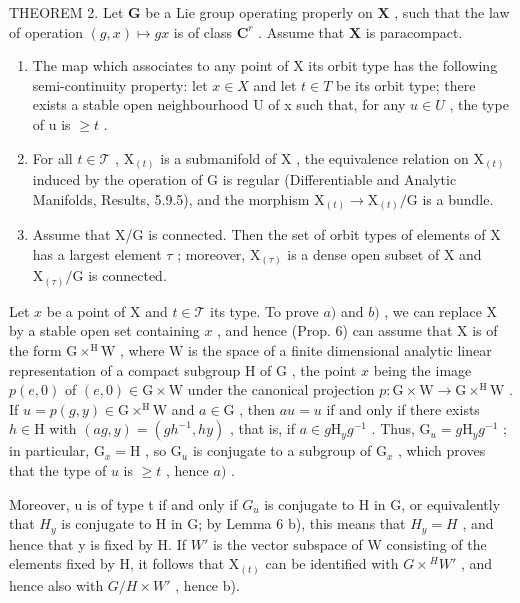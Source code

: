 THEOREM 2. Let \(\mathbf{G}\) be a Lie group operating properly on \(\mathbf{X}\) , such that the law of operation \((g,x)\mapsto gx\) is of class \(\mathbf{C}^r\) . Assume that \(\mathbf{X}\) is paracompact.

\begin{enumerate}
\def\labelenumi{\alph{enumi})}
\item
  The map which associates to any point of X its orbit type has the following semi-continuity property: let \(x \in X\) and let \(t \in T\) be its orbit type; there exists a stable open neighbourhood U of x such that, for any \(u \in U\) , the type of u is \(\geq t\) .
\item
  For all \(t \in \mathcal{T}\) , \(\mathrm{X}_{(t)}\) is a submanifold of \(\mathrm{X}\) , the equivalence relation on \(\mathrm{X}_{(t)}\) induced by the operation of \(\mathrm{G}\) is regular (Differentiable and Analytic Manifolds, Results, 5.9.5), and the morphism \(\mathrm{X}_{(t)} \to \mathrm{X}_{(t)} / \mathrm{G}\) is a bundle.
\item
  Assume that X/G is connected. Then the set of orbit types of elements of X has a largest element \(\tau\) ; moreover, \(\mathrm{X}_{(\tau)}\) is a dense open subset of X and \(\mathrm{X}_{(\tau)}/\mathrm{G}\) is connected.
\end{enumerate}

Let \(x\) be a point of \(\mathrm{X}\) and \(t \in \mathcal{T}\) its type. To prove \(a)\) and \(b)\) , we can replace \(\mathrm{X}\) by a stable open set containing \(x\) , and hence (Prop. 6) can assume that \(\mathrm{X}\) is of the form \(\mathrm{G} \times^{\mathrm{H}}\mathrm{W}\) , where \(\mathrm{W}\) is the space of a finite dimensional analytic linear representation of a compact subgroup \(\mathrm{H}\) of \(\mathrm{G}\) , the point \(x\) being the image \(p(e,0)\) of \((e,0) \in \mathrm{G} \times \mathrm{W}\) under the canonical projection \(p: \mathrm{G} \times \mathrm{W} \to \mathrm{G} \times^{\mathrm{H}}\mathrm{W}\) . If \(u = p(g,y) \in \mathrm{G} \times^{\mathrm{H}}\mathrm{W}\) and \(a \in \mathrm{G}\) , then \(au = u\) if and only if there exists \(h \in \mathrm{H}\) with \((ag,y) = (gh^{-1},hy)\) , that is, if \(a \in g\mathrm{H}_yg^{-1}\) . Thus, \(\mathrm{G}_u = g\mathrm{H}_yg^{-1}\) ; in particular, \(\mathrm{G}_x = \mathrm{H}\) , so \(\mathrm{G}_u\) is conjugate to a subgroup of \(\mathrm{G}_x\) , which proves that the type of \(u\) is \(\geq t\) , hence \(a)\) .

Moreover, u is of type t if and only if \(G_{u}\) is conjugate to H in G, or equivalently that \(H_{y}\) is conjugate to H in G; by Lemma 6 b), this means that \(H_{y} = H\) , and hence that y is fixed by H. If \(W'\) is the vector subspace of W consisting of the elements fixed by H, it follows that \(\mathrm{X}_{(t)}\) can be identified with \(G \times {}^{H}W'\) , and hence also with \(G/H \times W'\) , hence b).

